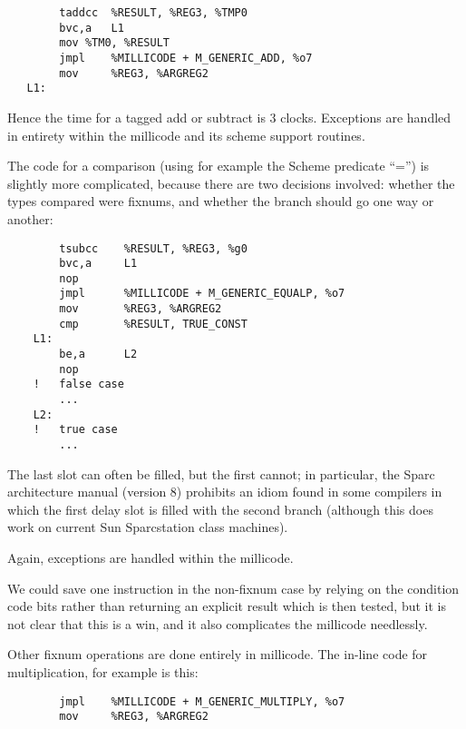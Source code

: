 \begin{minipage}{\linewidth}
\begin{verbatim}
        taddcc  %RESULT, %REG3, %TMP0
        bvc,a   L1
        mov	%TM0, %RESULT
        jmpl    %MILLICODE + M_GENERIC_ADD, %o7
        mov     %REG3, %ARGREG2
   L1:
\end{verbatim}
\end{minipage}

Hence the time for a tagged add or subtract is 3 clocks.  Exceptions
are handled in entirety within the millicode and its scheme support
routines.

The code for a comparison (using for example the Scheme predicate
``='') is slightly more complicated, because there are two decisions
involved: whether the types compared were fixnums, and whether the
branch should go one way or another:

\begin{minipage}{\linewidth}
\begin{verbatim}
        tsubcc    %RESULT, %REG3, %g0
        bvc,a     L1
        nop
        jmpl      %MILLICODE + M_GENERIC_EQUALP, %o7
        mov       %REG3, %ARGREG2
        cmp       %RESULT, TRUE_CONST
    L1:
        be,a      L2
        nop
    !   false case
        ...
    L2:
    !   true case
        ...
\end{verbatim}
\end{minipage}

The last slot can often be filled, but the first cannot; in particular,
the Sparc architecture manual (version 8) prohibits an idiom found in
some compilers in which the first delay slot is filled with the second
branch (although this does work on current Sun Sparcstation class machines).

Again, exceptions are handled within the millicode.

We could save one instruction in the non-fixnum case by relying on the
condition code bits rather than returning an explicit result which is then
tested, but it is not clear that this is a win, and it also complicates the
millicode needlessly.

Other fixnum operations are done entirely in millicode. The in-line code
for multiplication, for example is this:

\begin{minipage}{\linewidth}
\begin{verbatim}
        jmpl    %MILLICODE + M_GENERIC_MULTIPLY, %o7
        mov     %REG3, %ARGREG2
\end{verbatim}
\end{minipage}

